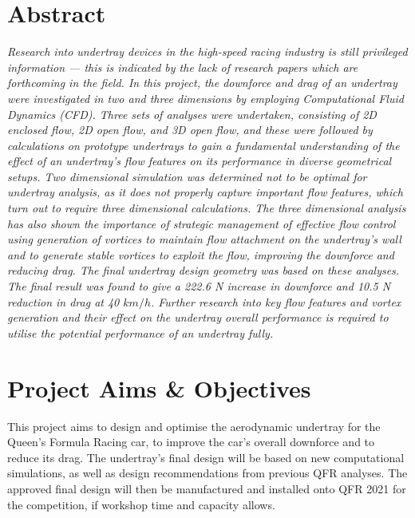 \newpage
\thispagestyle{empty}
\section*{Abstract} 
\justifying

\textit{Research into undertray devices in the high-speed racing industry is still privileged information --- this is indicated by the lack of research papers which are forthcoming in the field. In this project, the downforce and drag of an undertray were investigated in two and three dimensions by employing Computational Fluid Dynamics (CFD). Three sets of analyses were undertaken, consisting of 2D enclosed flow, 2D open flow, and 3D open flow, and these were followed by calculations on prototype undertrays to gain a fundamental understanding of the effect of an undertray's flow features on its performance in diverse geometrical setups. Two dimensional simulation was determined not to be optimal for undertray analysis, as it does not properly capture important flow features, which turn out to require three dimensional calculations. The three dimensional analysis has also shown the importance of strategic management of effective flow control using generation of vortices to maintain flow attachment on the undertray's wall and to generate stable vortices to exploit the flow, improving the downforce and reducing drag. The final undertray design geometry was based on these analyses. The final result was found to give a 222.6 N increase in downforce and 10.5 N reduction in drag at 40 $km/h$. Further research into key flow features and vortex generation and their effect on the undertray overall performance is required to utilise the potential performance of an undertray fully.}


\section*{Project Aims \& Objectives}
This project aims to design and optimise the aerodynamic undertray for the Queen's Formula Racing car, to improve the car's overall downforce and to reduce its drag. The undertray's final design will be based on new computational simulations, as well as design recommendations from previous QFR analyses. The approved final design will then be manufactured and installed onto QFR 2021 for the competition, if workshop time and capacity allows.


